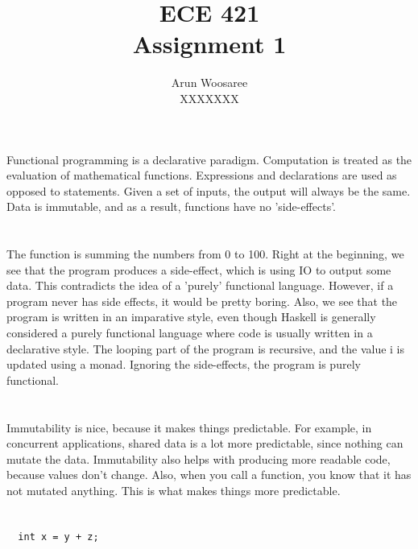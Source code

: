 \documentclass[letterpaper]{article}
\title{ECE 421 \\
Assignment 1}
\author{Arun Woosaree\\
XXXXXXX
}
\begin{document}
\maketitle %

\section{}
Functional programming is a declarative paradigm.
Computation is treated as the evaluation of mathematical functions.
Expressions and declarations are used as opposed to statements.
Given a set of inputs, the output will always be the same.
Data is immutable, and as a result,
functions have no 'side-effects'.

\section{}
The function is summing the numbers from 0 to 100.
Right at the beginning, we see that the program produces a side-effect, which
is using IO to output some data. This contradicts the idea of a 'purely'
functional language. However, if a program never has side effects, it would be
pretty boring.
Also, 
we see that the program is written in an imparative style, even though Haskell
is generally considered a purely functional language where code is usually
written in a declarative style. The looping part of the program is recursive,
and the value i is updated using a monad. Ignoring the side-effects, the program
is purely functional. 


\section{}
Immutability is nice, because it makes things predictable.
For example, in concurrent applications, shared data is a lot more predictable,
since nothing can mutate the data. 
Immutability also helps with producing more readable code, because values don't
change. Also, when you call a function, you know that it has not mutated
anything. This is what makes things more predictable.

\section{}
\subsection{}
\begin{verbatim}
  int x = y + z;
\end{verbatim}
\end{document}
